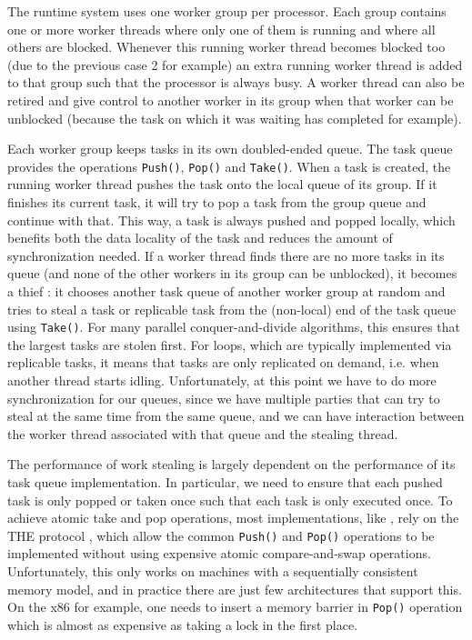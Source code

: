 The runtime system uses one worker group per processor. Each group
contains one or more worker threads where only one of them is running
and where all others are blocked. Whenever this running worker thread
becomes blocked too (due to the previous case 2 for example) an extra
running worker thread is added to that group such that the processor
is always busy. A worker thread can also be retired and give control
to another worker in its group when that worker can be unblocked
(because the task on which it was waiting has completed for example).

Each worker group keeps tasks in its own doubled-ended queue. The task
queue provides the operations \lstinline!Push()!, \lstinline!Pop()! and
\lstinline!Take()!. When a task is created, the running worker thread
pushes the task onto the local queue of its group. If it finishes its
current task, it will try to pop a task from the group queue and
continue with that. This way, a task is always pushed and popped
locally, which benefits both the data locality of the task and reduces
the amount of synchronization needed. If a worker thread finds there
are no more tasks in its queue (and none of the other workers in its
group can be unblocked), it becomes a thief : it chooses another task
queue of another worker group at random and tries to steal a task or
replicable task from the (non-local) end of the task queue using
\lstinline!Take()!. For many parallel conquer-and-divide algorithms,
this ensures that the largest tasks are stolen first. For loops,
which are typically implemented via replicable tasks, it means that
tasks are only replicated on demand, i.e. when another thread starts
idling. Unfortunately, at this point we have to do more
synchronization for our queues, since we have multiple parties that
can try to steal at the same time from the same queue, and we can have
interaction between the worker thread associated with that queue and
the stealing thread.

The performance of work stealing is largely dependent on the
performance of its task queue implementation. In particular, we need
to ensure that each pushed task is only popped or taken once such that
each task is only executed once. To achieve atomic take and pop
operations, most implementations, like \cite{Arora2001}, rely on the
THE protocol \cite{Dijkstra1965}, which allow the common
\lstinline!Push()! and \lstinline!Pop()! operations to be implemented
without using expensive atomic compare-and-swap
operations. Unfortunately, this only works on machines with a
sequentially consistent memory model, and in practice there are just
few architectures that support this. On the x86 for example, one needs
to insert a memory barrier in \lstinline!Pop()! operation which is
almost as expensive as taking a lock in the first place.

